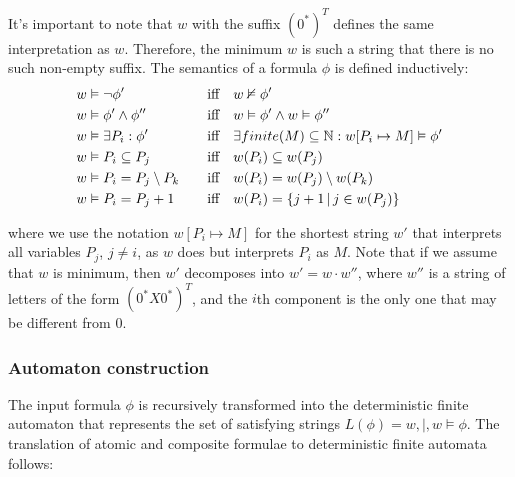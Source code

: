 \documentclass[pdflatex,sn-mathphys-num]{sn-jnl}%
\theoremstyle{thmstyleone}%
\theoremstyle{thmstyletwo}%
\theoremstyle{thmstylethree}%
\begin{document}
            \noindent It's important to note that $w$ with the suffix $(0^*)^T$ defines the same interpretation as $w$. Therefore, the minimum $w$ is such a string that there is no such non-empty suffix. The semantics of a formula $\phi$ is defined inductively:
                \begin{alignat*}{2}
                    &w \vDash \neg \phi' \quad && \textnormal{iff}\quad  w \nvDash \phi'\\
                    &w \vDash \phi' \land \phi'' \quad &&\textnormal{iff}\quad  w \vDash \phi' \land w \vDash \phi''\\
                    &w \vDash \exists P_i : \phi' \quad &&\textnormal{iff}\quad  \exists finite(M) \subseteq \mathbb{N} : w[P_i \mapsto M] \vDash \phi'\\
                    &w \vDash P_i \subseteq P_j \quad &&\textnormal{iff}\quad  w(P_i) \subseteq w(P_j)\\
                    &w \vDash P_i = P_j \setminus P_k \quad &&\textnormal{iff}\quad  w(P_i) = w(P_j) \setminus w(P_k)\\
                    &w \vDash P_i = P_j + 1 \quad &&\textnormal{iff}\quad  w(P_i) = \{j + 1\,|\, j \in w(P_j)\}
                \end{alignat*}

                where we use the notation $w[P_i \mapsto M]$ for the shortest string $w'$ that interprets all variables $P_j$, $j \neq i$, as $w$ does but interprets $P_i$ as $M$. Note that if we assume that $w$ is minimum, then $w'$ decomposes into $w' = w \cdot w''$, where $w''$ is a string of letters of the form $(0^*X0^*)^T$, and the $i$th component is the only one that may be different from 0.

        \subsubsection*{Automaton construction}
            The input formula $\phi$ is recursively transformed into the deterministic finite automaton that represents the set of satisfying strings $L(\phi) = {w,|, w \vDash \phi}$. The translation of atomic and composite formulae to deterministic finite automata follows:


            \vspace*{0.5em}
\end{document}

